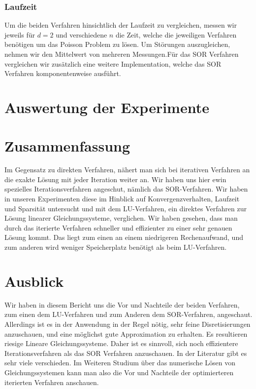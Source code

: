 \documentclass[smallheadings]{scrartcl}
\theoremstyle{definition}
\begin{document}
\subsubsection{Laufzeit}
Um die beiden Verfahren hinsichtlich der Laufzeit zu vergleichen,  messen wir jeweils für $d=2$ und verschiedene $n$ die Zeit, welche die jeweiligen Verfahren benötigen um das Poisson Problem zu lösen.  Um Störungen auszugleichen,  nehmen wir den Mittelwert von mehreren Messungen.Für das SOR Verfahren vergleichen wir zusätzlich eine weitere Implementation,  welche das SOR Verfahren komponentenweise ausführt. 



\section{Auswertung der Experimente}
\section{Zusammenfassung}

Im Gegensatz zu direkten Verfahren, nähert man sich bei iterativen Verfahren an die exakte Lösung mit jeder Iteration weiter an.  Wir haben uns hier ewin spezielles Iterationsverfahren angeschut, nämlich das SOR-Verfahren. Wir haben in unseren Experimenten diese im Hinblick auf Konvergenzverhalten, Laufzeit und Sparsität untersucht und mit dem LU-Verfahren, ein direktes Verfahren zur Lösung linearer Gleichungssysteme, verglichen.  Wir haben gesehen, dass man durch das iterierte Verfahren schneller und effizienter zu einer sehr genauen Lösung kommt.  Das liegt zum einen an einem niedrigeren Rechenaufwand, und zum anderen wird weniger Speicherplatz benötigt als beim LU-Verfahren. 

\section{Ausblick}
Wir haben in diesem Bericht uns die Vor und Nachteile der beiden Verfahren, zum einen dem LU-Verfahren und zum Anderen dem SOR-Verfahren, angeschaut.  Allerdings ist es in der Anwendung in der Regel nötig,  sehr feine Disretisierungen anzuschauen, und eine möglichst gute Approximation zu erhalten.  Es resultieren riesige Lineare Gleichungssysteme. Daher ist es sinnvoll, sich noch effizientere Iterationsverfahren als das SOR Verfahren anzuschauen. In der Literatur gibt es sehr viele verschieden. Im Weiteren Studium über das numerische Lösen von Gleichungssystemen kann man also die Vor und Nachteile der optimierteren iterierten Verfahren anschauen. 



\printbibliography

\end{document}
